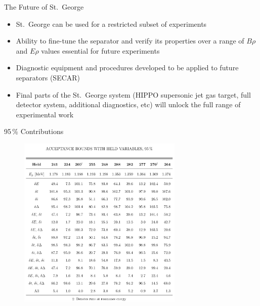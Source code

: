 \documentclass[10pt]{beamer}
\begin{document}
\begin{frame}[fragile]{The Future of St.\ George}

    \begin{itemize}
        \item St.\ George can be used for a restricted subset of experiments
        \item Ability to fine-tune the separator and verify its properties over a
    range of $B\rho$ and $E\rho$ values essential for future experiments
        \item Diagnostic equipment and procedures developed to be applied to
    future separators (SECAR)
        \item Final parts of the St.\ George system (HIPPO supersonic jet gas
    target, full detector system, additional diagnostics, etc) will
    unlock the full range of experimental work
    \end{itemize}

\end{frame}

\maketitle

\appendix


\begin{frame}[fragile]{95\,\% Contributions}  %

    \begin{figure}
        \includegraphics[width=0.7\textwidth]{figures/table_95.png}
    \end{figure}

\end{frame}
\end{document}
